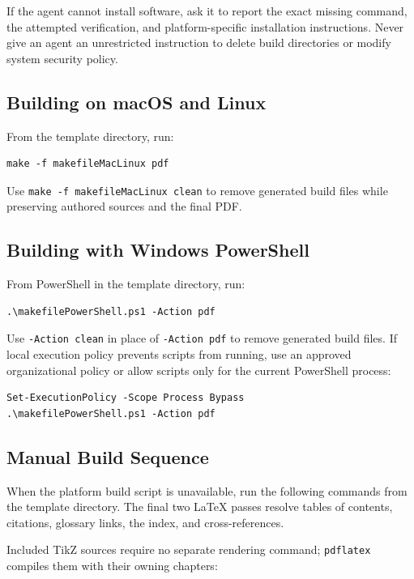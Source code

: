 If the agent cannot install software, ask it to report the exact missing
command, the attempted verification, and platform-specific installation
instructions. Never give an agent an unrestricted instruction to delete build
directories or modify system security policy.

\subsection{Building on macOS and Linux}

From the template directory, run:

\begin{verbatim}
make -f makefileMacLinux pdf
\end{verbatim}

Use \texttt{make -f makefileMacLinux clean} to remove generated build files while preserving authored sources and the final PDF.

\subsection{Building with Windows PowerShell}

From PowerShell in the template directory, run:

\begin{verbatim}
.\makefilePowerShell.ps1 -Action pdf
\end{verbatim}

Use \texttt{-Action clean} in place of \texttt{-Action pdf} to remove generated build files. If local execution policy prevents scripts from running, use an approved organizational policy or allow scripts only for the current PowerShell process:

\begin{verbatim}
Set-ExecutionPolicy -Scope Process Bypass
.\makefilePowerShell.ps1 -Action pdf
\end{verbatim}

\subsection{Manual Build Sequence}

When the platform build script is unavailable, run the following commands from
the template directory. The final two LaTeX passes resolve tables of contents,
citations, glossary links, the index, and cross-references.

Included TikZ sources require no separate rendering command; \texttt{pdflatex}
compiles them with their owning chapters:

